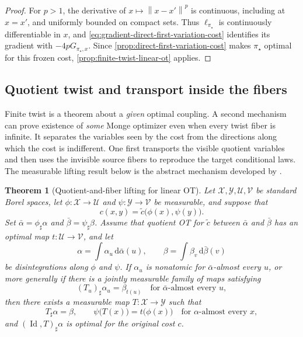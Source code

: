\documentclass[11pt,a4paper]{article}
\newtheorem{theorem}{Theorem}[section]
\theoremstyle{definition}
\theoremstyle{remark}
\newcommand{\Id}{\operatorname{Id}}
\newcommand{\dd}{\,\mathrm d}
\newcommand{\norm}[1]{\left\lVert #1\right\rVert}
\begin{document}
\begin{proof}
For \(p>1\), the derivative of \(x\mapsto\norm{x-x'}^p\) is continuous,
including at \(x=x'\), and uniformly bounded on compact sets.  Thus
\(\ell_{\pi_\star}\) is continuously differentiable in \(x\), and
\eqref{eq:gradient-direct-first-variation-cost} identifies its gradient with
\(-4pG_{\pi_\star,x}\).  Since
\cref{prop:direct-first-variation-cost} makes \(\pi_\star\) optimal for this
frozen cost, \cref{prop:finite-twist-linear-ot} applies.
\end{proof}

\subsection{Quotient twist and transport inside the fibers}

Finite twist is a theorem about a \emph{given} optimal coupling.  A second
mechanism can prove existence of \emph{some} Monge optimizer even when every
twist fiber is infinite.  It separates the variables seen by the cost from
the directions along which the cost is indifferent.  One first transports
the visible quotient variables and then uses the invisible source fibers to
reproduce the target conditional laws.  The measurable lifting result below
is the abstract mechanism developed by
\citet[Theorem~2.1]{DumontLacombeVialard2025}.

\begin{theorem}[Quotient-and-fiber lifting for linear OT]
\label{thm:quotient-fiber-linear-ot}
Let \(\mathcal X,\mathcal Y,\mathcal U,\mathcal V\) be standard Borel
spaces, let
\(
  \phi:\mathcal X\to\mathcal U
\)
and
\(
  \psi:\mathcal Y\to\mathcal V
\)
be measurable, and suppose that
\begin{equation}
  c(x,y)=\widetilde c\bigl(\phi(x),\psi(y)\bigr).
  \label{eq:quotient-cost-factorization}
\end{equation}
Set \(\bar\alpha=\phi_\sharp\alpha\) and
\(\bar\beta=\psi_\sharp\beta\).  Assume that quotient OT for
\(\widetilde c\) between \(\bar\alpha\) and \(\bar\beta\) has an optimal
map \(t:\mathcal U\to\mathcal V\), and let
\begin{equation}
  \alpha=\int\alpha_u\dd\bar\alpha(u),
  \qquad
  \beta=\int\beta_v\dd\bar\beta(v)
  \label{eq:quotient-disintegrations}
\end{equation}
be disintegrations along \(\phi\) and \(\psi\).  If \(\alpha_u\) is
nonatomic for \(\bar\alpha\)-almost every \(u\), or more generally if there
is a jointly measurable family of maps satisfying
\begin{equation}
  (T_u)_\sharp\alpha_u=\beta_{t(u)}
  \quad\text{for \(\bar\alpha\)-almost every \(u\)},
  \label{eq:fiberwise-transport-maps}
\end{equation}
then there exists a
measurable map \(T:\mathcal X\to\mathcal Y\) such that
\begin{equation}
  T_\sharp\alpha=\beta,
  \qquad
  \psi\bigl(T(x)\bigr)=t\bigl(\phi(x)\bigr)
  \quad\text{for \(\alpha\)-almost every \(x\)},
  \label{eq:quotient-map-lift}
\end{equation}
and \((\Id,T)_\sharp\alpha\) is optimal for the original cost \(c\).
\end{theorem}
\end{document}
